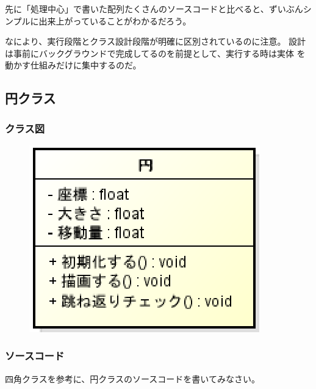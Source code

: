 \documentclass[uplatex,a4j,11pt]{jsarticle}
\begin{document}
先に「処理中心」で書いた配列たくさんのソースコードと比べると、ずいぶんシ
ンプルに出来上がっていることがわかるだろう。

なにより、実行段階とクラス設計段階が明確に区別されているのに注意。
設計は事前にバックグラウンドで完成してるのを前提として、実行する時は実体
を動かす仕組みだけに集中するのだ。


\subsection{円クラス}

\subsubsection{クラス図}

\begin{figure}[h]
  \begin{center}
   \includegraphics[width=.2\paperwidth]{zu8.eps}
   \caption{}
   \label{zu5}
  \end{center}
\end{figure}

\subsubsection{ソースコード}

四角クラスを参考に、円クラスのソースコードを書いてみなさい。
\end{document}

